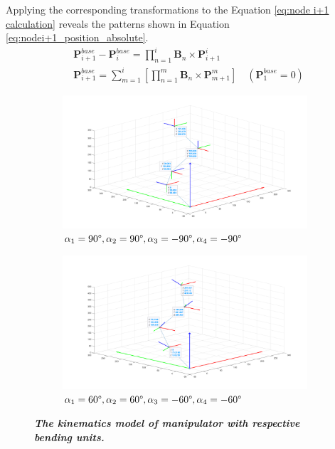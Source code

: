 Applying the corresponding transformations to the Equation \ref{eq:node i+1 calculation} reveals the patterns shown in Equation \ref{eq:nodei+1_position_absolute}.
\begin{align}
    &\textbf{P}_{i+1}^{base} - \textbf{P}_{i}^{base} = \prod_{n=1}^{i}\textbf{B}_{n}\times \textbf{P}_{i+1}^{i} \\
    &\textbf{P}_{i+1}^{base} = \sum_{m=1}^{i}\left[\prod_{n=1}^{m}\textbf{B}_{n}\times \textbf{P}_{m+1}^{m}\right] \quad(\textbf{P}_{1}^{base} = 0)
    \label{eq:nodei+1_position_absolute}
\end{align}

\begin{figure}[H] %
    \centering %
    \captionsetup{labelsep=colon}
    \begin{subfigure}{0.9\textwidth} %
        \centering
        \includegraphics[width=\linewidth]{Image/MATLAB/manipulator_90_90_-90_-90.png}
        \caption{$\alpha_1=90\degree,\alpha_2=90\degree,\alpha_3=-90\degree,\alpha_4=-90\degree$}
    \end{subfigure}
    \hfill
    \begin{subfigure}{0.9\textwidth} %
        \centering
        \includegraphics[width=\linewidth]{Image/MATLAB/manipulator_60_60_-60_-60.png}
        \caption{$\alpha_1=60\degree,\alpha_2=60 \degree,\alpha_3=-60\degree,\alpha_4=-60\degree$}
    \end{subfigure}
    \caption[The kinematics model of manipulator with respective bending units]
    {\centering \textit{\textbf{The kinematics model of manipulator with respective bending units.}}}
    \label{fig:different}
\end{figure}

\newpage